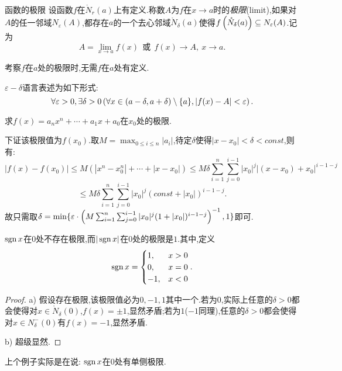 \begin{definition}{函数的极限}
	设函数$f$在$\mathring{N}_{r}(a)$上有定义.称数$A$为$f$在$x\to a$时的\textit{极限}(limit),如果对$A$的任一邻域$N_{\varepsilon}(A)$,都存在$a$的一个去心邻域$\mathring{N}_{\delta}(a)$使得$f\left( \mathring{N}_{\delta}(a) \right) \subseteq N_{\varepsilon}(A)$.记为$$A = \lim_{x \to a} f(x) ~~ \text{或} ~~ f(x) \to A,~x \to a.$$
\end{definition}
\begin{remark}
	考察$f$在$a$处的极限时,无需$f$在$a$处有定义.
\end{remark}
\begin{remark}
	$\varepsilon - \delta$语言表述为如下形式:$$\forall \varepsilon >0, \exists \delta >0 \left( \forall x \in (a-\delta ,a+\delta) \setminus \{ a\},|f(x)-A|<\varepsilon \right).$$
\end{remark}

\begin{example}
	求$f(x)=a_nx^n + \cdots + a_1x+a_0$在$x_0$处的极限.
\end{example}
\begin{solution}
	下证该极限值为$f(x_0)$.取$M=\max_{0 \leq i \leq n}|a_i|$,待定$\delta$使得$|x-x_0|<\delta <const$,则有:
	$$|f(x)-f(x_0)|\leq M(|x^n-x_0^n| + \cdots + |x-x_0|) \leq M\delta\sum_{i=1}^{n} \sum_{j=0}^{i-1} |x_0|^j |(x-x_0)+x_0|^{i-1-j}$$
	$$\leq M\delta\sum_{i=1}^{n} \sum_{j=0}^{i-1} |x_0|^j (const +|x_0|)^{i-1-j}.$$
	故只需取$\delta = \min \{ \varepsilon \cdot \left( M\sum_{i=1}^{n} \sum_{j=0}^{i-1} |x_0|^j (1 +|x_0|)^{i-1-j} \right)^{-1},1 \}$即可.
\end{solution}

\begin{example}
	$\operatorname{sgn} x$在$0$处不存在极限,而$|\operatorname{sgn} x|$在$0$处的极限是$1$.其中,定义$$\operatorname{sgn} x = \begin{cases}
		1,&x>0 \\ 0,&x=0 \\ -1,&x<0
	\end{cases}.$$
\end{example}
\begin{proof}
	a) 假设存在极限,该极限值必为$0,-1,1$其中一个.若为$0$,实际上任意的$\delta >0$都会使得对$x \in \mathring{N}_{\delta} (0)$,$f(x)=\pm 1$,显然矛盾;若为$1$($-1$同理),任意的$\delta >0$都会使得对$x \in N_{\delta}^{-}(0)$有$f(x)=-1$,显然矛盾.
	
	b) 超级显然.
\end{proof}

上个例子实际是在说: $\operatorname{sgn} x$在$0$处有单侧极限.

